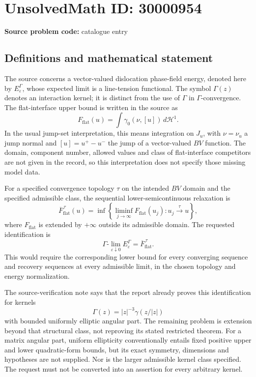 \documentclass[11pt]{article}
\begin{document}
\section*{UnsolvedMath ID: 30000954}
\textbf{Source problem code:} catalogue entry
\subsection{Definitions and mathematical statement}
The source concerns a vector-valued dislocation phase-field energy, denoted here by $E_\varepsilon^{\Gamma}$, whose expected limit is a line-tension functional. The symbol $\Gamma(z)$ denotes an interaction kernel; it is distinct from the use of $\Gamma$ in $\Gamma$-convergence. The flat-interface upper bound is written in the source as
\[
F_{\mathrm{flat}}(u)=\int\gamma_0(\nu,[u])\,d\mathcal H^1.
\]
In the usual jump-set interpretation, this means integration on $J_u$, with $\nu=\nu_u$ a jump normal and $[u]=u^+-u^-$ the jump of a vector-valued $BV$ function. The domain, component number, allowed values and class of flat-interface competitors are not given in the record, so this interpretation does not specify those missing model data.

For a specified convergence topology $\tau$ on the intended $BV$ domain and the specified admissible class, the sequential lower-semicontinuous relaxation is
\[
\overline F_{\mathrm{flat}}^{\,\tau}(u)
=\inf\left\{\liminf_{j\to\infty}F_{\mathrm{flat}}(u_j):u_j\xrightarrow{\tau}u\right\},
\]
where $F_{\mathrm{flat}}$ is extended by $+\infty$ outside its admissible domain. The requested identification is
\[
\Gamma\text{-}\lim_{\varepsilon\downarrow0}E_\varepsilon^{\Gamma}
=\overline F_{\mathrm{flat}}^{\,\tau}.
\]
This would require the corresponding lower bound for every converging sequence and recovery sequences at every admissible limit, in the chosen topology and energy normalization.

The source-verification note says that the report already proves this identification for kernels
\[
\Gamma(z)=|z|^{-3}\gamma(z/|z|)
\]
with bounded uniformly elliptic angular part. The remaining problem is extension beyond that structural class, not reproving its stated restricted theorem. For a matrix angular part, uniform ellipticity conventionally entails fixed positive upper and lower quadratic-form bounds, but its exact symmetry, dimensions and hypotheses are not supplied. Nor is the larger admissible kernel class specified. The request must not be converted into an assertion for every arbitrary kernel.
\end{document}
